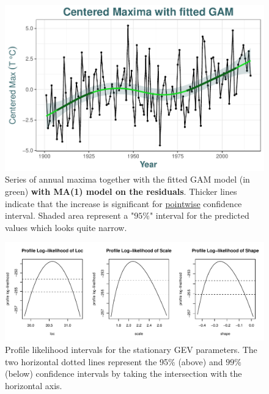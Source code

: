 \begin{figure}[!htb]
\centering	\includegraphics[width=.7\linewidth]{max_gam.pdf}\caption{Series of annual maxima together with the fitted GAM model (in green) \textbf{with MA(1) model on the residuals}. Thicker lines indicate that the increase is significant for \underline{pointwise} confidence interval. Shaded area represent a "$95\%$" interval for the predicted values which looks quite narrow. }\label{fig:center_gam}
\end{figure}






\begin{figure}[!htb]
\centering	\includegraphics[width=.85\linewidth]{proflikpar.pdf}\caption{ Profile likelihood intervals for the stationary GEV parameters. The two horizontal dotted lines represent the 95$\%$ (above) and $99\%$ (below) confidence intervals by taking the intersection with the horizontal axis.}\label{fig:proflikpar}
\end{figure}



